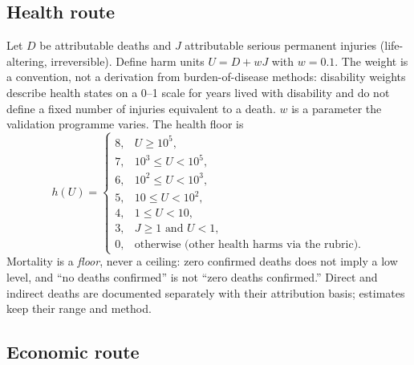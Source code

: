 \documentclass[11pt,a4paper]{article}
\begin{document}
\subsection{Health route}

Let $D$ be attributable deaths and $J$ attributable serious permanent injuries (life-altering, irreversible). Define harm units $U = D + w J$ with $w = 0.1$. The weight is a convention, not a derivation from burden-of-disease methods: disability weights \citep{salomon2015} describe health states on a 0--1 scale for years lived with disability and do not define a fixed number of injuries equivalent to a death. $w$ is a parameter the validation programme varies. The health floor is
\begin{equation}
h(U) =
\begin{cases}
8, & U \ge 10^{5},\\
7, & 10^{3} \le U < 10^{5},\\
6, & 10^{2} \le U < 10^{3},\\
5, & 10 \le U < 10^{2},\\
4, & 1 \le U < 10,\\
3, & J \ge 1 \text{ and } U < 1,\\
0, & \text{otherwise (other health harms via the rubric).}
\end{cases}
\label{eq:h}
\end{equation}
Mortality is a \emph{floor}, never a ceiling: zero confirmed deaths does not imply a low level, and ``no deaths confirmed'' is not ``zero deaths confirmed.'' Direct and indirect deaths are documented separately with their attribution basis; estimates keep their range and method.

\subsection{Economic route}
\end{document}
